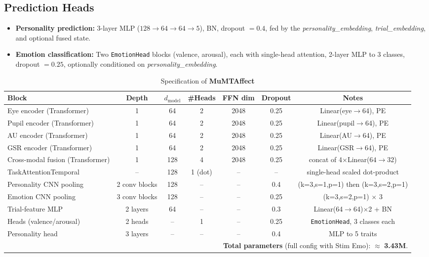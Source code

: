\documentclass[sigconf]{acmart}
\begin{document}
\subsection{Prediction Heads}

\begin{itemize}
    \item \textbf{Personality prediction:} 3-layer MLP ($128\!\to\!64\!\to\!64\!\to\!5$), BN, dropout $=0.4$, fed by the \emph{personality\_embedding}, \emph{trial\_embedding}, and optional fused state.
    \item \textbf{Emotion classification:} Two \texttt{EmotionHead} blocks (valence, arousal), each with single-head attention, 2-layer MLP to 3 classes, dropout $=0.25$, optionally conditioned on \emph{personality\_embedding}.
\end{itemize}

\begin{table}[t]
\centering
\caption{Specification of \textbf{MuMTAffect}}
\label{tab:model_spec}
\begin{tabular}{lcccccc}
\toprule
\textbf{Block} & \textbf{Depth} & \textbf{$d_{\text{model}}$} & \textbf{\#Heads} & \textbf{FFN dim} & \textbf{Dropout} & \textbf{Notes} \\
\midrule
Eye encoder (Transformer)   & 1 & 64  & 2 & 2048 & 0.25 & Linear(eye$\to$64), PE \\
Pupil encoder (Transformer) & 1 & 64  & 2 & 2048 & 0.25 & Linear(pupil$\to$64), PE \\
AU encoder (Transformer)    & 1 & 64  & 2 & 2048 & 0.25 & Linear(AU$\to$64), PE \\
GSR encoder (Transformer)   & 1 & 64  & 2 & 2048 & 0.25 & Linear(GSR$\to$64), PE \\
\midrule
Cross-modal fusion (Transformer) & 1 & 128 & 4 & 2048 & 0.25 & concat of 4$\times$Linear($64\to32$) \\
TaskAttentionTemporal            & -- & 128 & 1 (dot) & -- & -- & single-head scaled dot-product \\
\midrule
Personality CNN pooling & 2 conv blocks & 128 & -- & -- & 0.4  & (k=3,s=1,p=1) then (k=3,s=2,p=1) \\
Emotion CNN pooling     & 3 conv blocks & 128 & -- & -- & 0.25 & (k=3,s=2,p=1) $\times$ 3 \\
Trial-feature MLP       & 2 layers      & 64  & -- & -- & 0.3  & Linear(64$\to$64)$\times$2 + BN \\
Heads (valence/arousal) & 2 heads       & --  & 1  & -- & 0.25 & \texttt{EmotionHead}, 3 classes each \\
Personality head        & 3 layers      & --  & -- & -- & 0.4  & MLP to 5 traits \\
\midrule
\multicolumn{7}{r}{\textbf{Total parameters} (full config with Stim Emo): $\approx$ \textbf{3.43M}.}\\
\bottomrule
\end{tabular}
\end{table}
\end{document}
